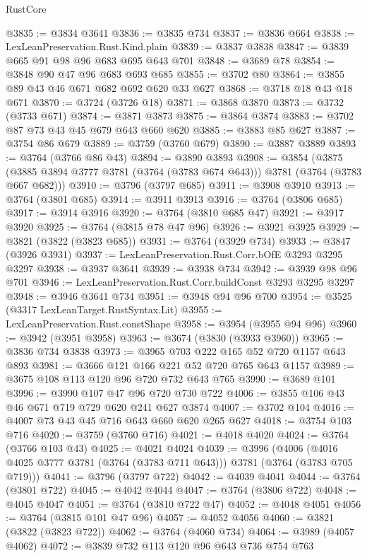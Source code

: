 \begin{lexlean}{RustCore}
\begin{coremodule}
@3835 := @3834 @3641
@3836 := @3835 @734
@3837 := @3836 @664
@3838 := LexLeanPreservation.Rust.Kind.plain
@3839 := @3837 @3838
@3847 := @3839 @665 @91 @98 @96 @683 @695 @643 @701
@3848 := @3689 @78
@3854 := @3848 @90 @47 @96 @683 @693 @685
@3855 := @3702 @80
@3864 := @3855 @89 @43 @46 @671 @682 @692 @620 @33 @627
@3868 := @3718 @18 @43 @18 @671
@3870 := @3724 (@3726 @18)
@3871 := @3868 @3870
@3873 := @3732 (@3733 @671)
@3874 := @3871 @3873
@3875 := @3864 @3874
@3883 := @3702 @87 @73 @43 @45 @679 @643 @660 @620
@3885 := @3883 @85 @627
@3887 := @3754 @86 @679
@3889 := @3759 (@3760 @679)
@3890 := @3887 @3889
@3893 := @3764 (@3766 @86 @43)
@3894 := @3890 @3893
@3908 := @3854
    (@3875 (@3885 @3894 @3777 @3781 (@3764 (@3783 @674 @643))) @3781 (@3764 (@3783 @667 @682)))
@3910 := @3796 (@3797 @685)
@3911 := @3908 @3910
@3913 := @3764 (@3801 @685)
@3914 := @3911 @3913
@3916 := @3764 (@3806 @685)
@3917 := @3914 @3916
@3920 := @3764 (@3810 @685 @47)
@3921 := @3917 @3920
@3925 := @3764 (@3815 @78 @47 @96)
@3926 := @3921 @3925
@3929 := @3821 (@3822 (@3823 @685))
@3931 := @3764 (@3929 @734)
@3933 := @3847 (@3926 @3931)
@3937 := LexLeanPreservation.Rust.Corr.bOfE @3293 @3295 @3297
@3938 := @3937 @3641
@3939 := @3938 @734
@3942 := @3939 @98 @96 @701
@3946 := LexLeanPreservation.Rust.Corr.buildConst @3293 @3295 @3297
@3948 := @3946 @3641 @734
@3951 := @3948 @94 @96 @700
@3954 := @3525 (@3317 LexLeanTarget.RustSyntax.Lit)
@3955 := LexLeanPreservation.Rust.constShape
@3958 := @3954 (@3955 @94 @96)
@3960 := @3942 (@3951 @3958)
@3963 := @3674 (@3830 (@3933 @3960))
@3965 := @3836 @734 @3838
@3973 := @3965 @703 @222 @165 @52 @720 @1157 @643 @893
@3981 := @3666 @121 @166 @221 @52 @720 @765 @643 @1157
@3989 := @3675 @108 @113 @120 @96 @720 @732 @643 @765
@3990 := @3689 @101
@3996 := @3990 @107 @47 @96 @720 @730 @722
@4006 := @3855 @106 @43 @46 @671 @719 @729 @620 @241 @627 @3874
@4007 := @3702 @104
@4016 := @4007 @73 @43 @45 @716 @643 @660 @620 @265 @627
@4018 := @3754 @103 @716
@4020 := @3759 (@3760 @716)
@4021 := @4018 @4020
@4024 := @3764 (@3766 @103 @43)
@4025 := @4021 @4024
@4039 := @3996
    (@4006 (@4016 @4025 @3777 @3781 (@3764 (@3783 @711 @643))) @3781 (@3764 (@3783 @705 @719)))
@4041 := @3796 (@3797 @722)
@4042 := @4039 @4041
@4044 := @3764 (@3801 @722)
@4045 := @4042 @4044
@4047 := @3764 (@3806 @722)
@4048 := @4045 @4047
@4051 := @3764 (@3810 @722 @47)
@4052 := @4048 @4051
@4056 := @3764 (@3815 @101 @47 @96)
@4057 := @4052 @4056
@4060 := @3821 (@3822 (@3823 @722))
@4062 := @3764 (@4060 @734)
@4064 := @3989 (@4057 @4062)
@4072 := @3839 @732 @113 @120 @96 @643 @736 @754 @763

\end{coremodule}
\end{lexlean}
